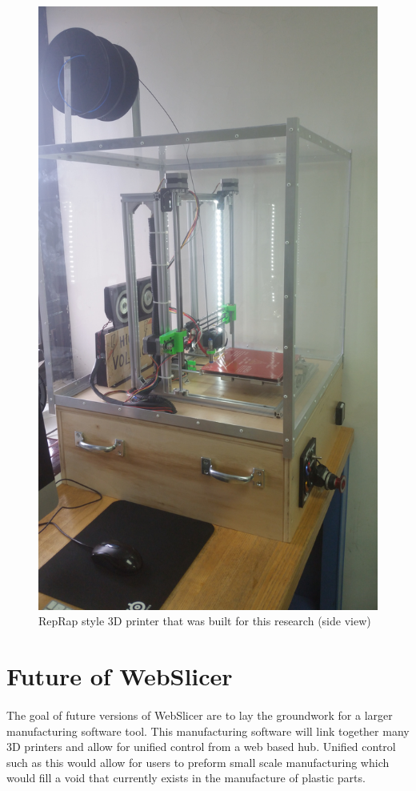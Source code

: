 \begin{figure}[t]
  \centering
  \includegraphics[width=\linewidth, angle=-90]{images/print2.jpg}
  \caption{RepRap style 3D printer that was built for this research (side view)}
  \label{fig:print2}
\end{figure}

\section{Future of WebSlicer}
\paragraph{}
The goal of future versions of WebSlicer are to lay the groundwork for a larger manufacturing software tool.
This manufacturing software will link together many 3D printers and allow for unified control from a web based hub.
Unified control such as this would allow for users to preform small scale manufacturing which would fill a void that currently exists in the manufacture of plastic parts.